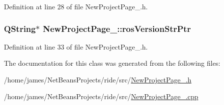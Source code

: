 Definition at line 28 of file New\-Project\-Page\-\_.\-h.

\hypertarget{class_new_project_page__1_a0929e17b526e8267f97a6ec6f0f3b629}{
\subsubsection[{ros\-Version\-Str\-Ptr}]{\setlength{\rightskip}{0pt plus 5cm}Q\-String$\ast$ New\-Project\-Page\-\_\-::ros\-Version\-Str\-Ptr\hspace{0.3cm}{\ttfamily [private]}}}\label{class_new_project_page__1_a0929e17b526e8267f97a6ec6f0f3b629}


Definition at line 33 of file New\-Project\-Page\-\_.\-h.



The documentation for this class was generated from the following files\-:\begin{DoxyCompactItemize}
\item 
/home/james/\-Net\-Beans\-Projects/ride/src/\hyperlink{_new_project_page__1_8h}{New\-Project\-Page\-\_.\-h}\item 
/home/james/\-Net\-Beans\-Projects/ride/src/\hyperlink{_new_project_page__1_8cpp}{New\-Project\-Page\-\_.\-cpp}\end{DoxyCompactItemize}

